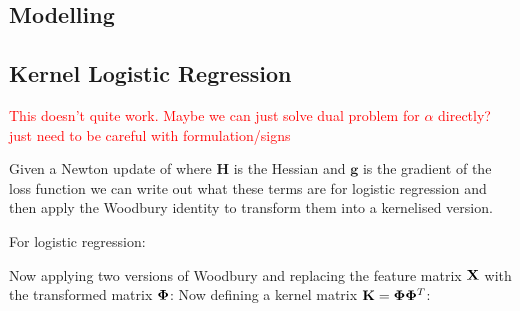 \begin{appendices}

\section{Modelling}

\subsection{Kernel Logistic Regression}
\textcolor{red}{This doesn't quite work. Maybe we can just solve dual problem for $\alpha$ directly? just need to be careful with formulation/signs}

Given a Newton update of
where $\bm{H}$ is the Hessian and $\bm{g}$ is the gradient of the loss function we can write out what these terms are for logistic regression and then apply the Woodbury identity to transform them into a kernelised version.

For logistic regression:

Now applying two versions of Woodbury and replacing the feature matrix $\mathbf{X}$ with the transformed matrix $\mathbf{\Phi}$:
Now defining a kernel matrix $\mathbf{K} = \mathbf{\Phi}\mathbf{\Phi}^T$:


\end{appendices}